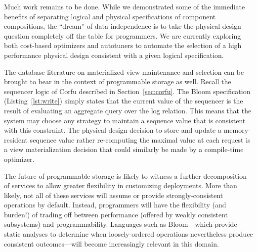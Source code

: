 \documentclass[10pt,twocolumn]{article}
\begin{document}
Much work remains to be done.  While we demonstrated some of the immediate
benefits of separating logical and physical specifications of component
compositions, the ``dream'' of data independence is to take the physical
design question completely off the table for programmers.  We are currently
exploring both cost-based optimizers and autotuners to automate the selection
of a high performance physical design consistent with a given logical
specification.  

The database literature on materialized view maintenance and selection can be
brought to bear in the context of programmable storage as well.  Recall the
sequencer logic of Corfu described in Section~\ref{sec:corfu}.  The Bloom specification
(Listing~\ref{lst:write}) simply states that the current value of the sequencer is the
result of evaluating an aggregate query over the log relation.  This means
that the system may choose any strategy to maintain a sequence value that is
consistent with this constraint.  The physical design decision to store and
update a memory-resident sequence value rather re-computing the maximal value
at each request is a view materialization decision that could similarly be
made by a compile-time optimizer.

The future of programmable storage is likely to witness a further
decomposition of services to allow greater flexibility in customizing
deployments.  More than likely, not all of these services will assume or
provide strongly-consistent operations by default.  Instead, programmers will
have the flexibility (and burden!) of trading off between performance (offered
by weakly consistent subsystems) and programmability.  Languages such as
Bloom---which provide static analyses to determine when loosely-ordered
operations nevertheless produce consistent outcomes---will become increasingly
relevant in this domain.




\end{document}
